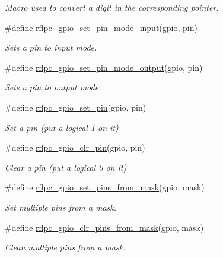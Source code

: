 \begin{DoxyCompactItemize}
\begin{DoxyCompactList}\small\item\em Macro used to convert a digit in the corresponding pointer. \end{DoxyCompactList}\item 
\#define \hyperlink{group__gpio_ga8ca3eecfb4561a44221a78d3bbf01f36}{rflpc\-\_\-gpio\-\_\-set\-\_\-pin\-\_\-mode\-\_\-input}(gpio, pin)
\begin{DoxyCompactList}\small\item\em Sets a pin to input mode. \end{DoxyCompactList}\item 
\#define \hyperlink{group__gpio_ga31769f3fff2e201eb4ddf05c4c50597c}{rflpc\-\_\-gpio\-\_\-set\-\_\-pin\-\_\-mode\-\_\-output}(gpio, pin)
\begin{DoxyCompactList}\small\item\em Sets a pin to output mode. \end{DoxyCompactList}\item 
\#define \hyperlink{group__gpio_ga4f616402c6e4fc8686a73b6a3146c245}{rflpc\-\_\-gpio\-\_\-set\-\_\-pin}(gpio, pin)
\begin{DoxyCompactList}\small\item\em Set a pin (put a logical 1 on it) \end{DoxyCompactList}\item 
\#define \hyperlink{group__gpio_ga78443ec84514dd058fc7dba315072805}{rflpc\-\_\-gpio\-\_\-clr\-\_\-pin}(gpio, pin)
\begin{DoxyCompactList}\small\item\em Clear a pin (put a logical 0 on it) \end{DoxyCompactList}\item 
\#define \hyperlink{group__gpio_ga49cfc85b1179f3084a9e30d84355ec86}{rflpc\-\_\-gpio\-\_\-set\-\_\-pins\-\_\-from\-\_\-mask}(gpio, mask)
\begin{DoxyCompactList}\small\item\em Set multiple pins from a mask. \end{DoxyCompactList}\item 
\#define \hyperlink{group__gpio_ga93d66d192a15b2fba0d56a5e08a517e0}{rflpc\-\_\-gpio\-\_\-clr\-\_\-pins\-\_\-from\-\_\-mask}(gpio, mask)
\begin{DoxyCompactList}\small\item\em Clean multiple pins from a mask. \end{DoxyCompactList}\item 

\end{DoxyCompactItemize}
